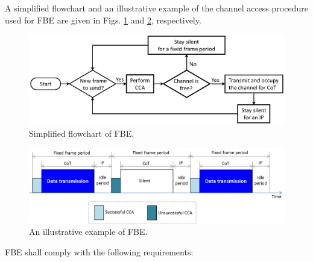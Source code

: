 A simplified flowchart and an illustrative example of the channel access procedure used for FBE are given in Figs. \ref{figs:FBE-flowchart} and \ref{figs:FBE-example}, respectively.
\begin{figure}[!ht]
	\centering
	\includegraphics[width=0.9\columnwidth]{figs/FBE-flowchart}
	\caption{Simplified flowchart of FBE.}
	\label{figs:FBE-flowchart}
\end{figure}
\begin{figure}[!ht]
	\centering
	\includegraphics[width=0.9\columnwidth]{figs/FBE-example}
	\caption{An illustrative example of FBE.}
	\label{figs:FBE-example}
\end{figure}


\noindent FBE shall comply with the following requirements:

